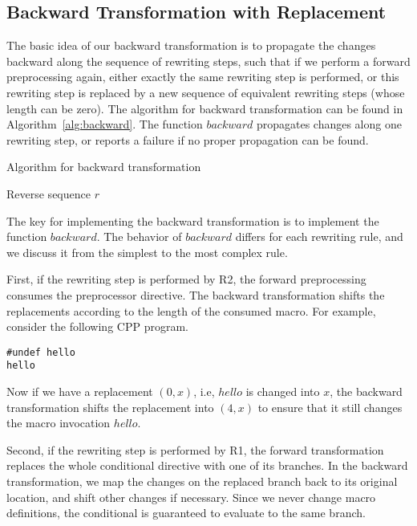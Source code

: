 

\subsection{Backward Transformation with Replacement}\label{sec:backward}
The basic idea of our backward transformation is to propagate the
changes backward along the sequence of rewriting steps, such that
if we perform a forward preprocessing again, either exactly the same
rewriting step is performed, or this rewriting step is replaced by a
new sequence of equivalent rewriting steps (whose length can 
be zero). The algorithm for backward
transformation can be found in Algorithm~\ref{alg:backward}. The
function $backward$ propagates changes along one rewriting step,
or reports a failure if no proper propagation can be found.

\begin{algorithm}
  \newcommand\mycommfont[1]{\rmfamily{#1}}
  \caption{Algorithm for backward transformation \label{alg:backward}}
  Reverse sequence $r$\;
  \;
\end{algorithm}

The key for implementing the backward transformation is to implement the
function $backward$. The behavior of $backward$ differs for each
rewriting rule, and we discuss it from the simplest to
the most complex rule.

First, if the rewriting step is performed by R2, the forward
preprocessing consumes the preprocessor directive. The backward
transformation shifts the replacements according to the length of the
consumed macro. For example, consider the following CPP program.
\begin{lstlisting}
#undef hello
hello
\end{lstlisting}
Now if we have a replacement $(0, x)$, i.e, $hello$ is changed into
$x$, the backward transformation shifts the replacement into $(4, x)$ to ensure
that it still changes the macro invocation $hello$.

Second, if the rewriting step is performed by R1, the forward
transformation replaces the whole conditional directive with one of its branches. In the
backward transformation, we map the changes on the replaced branch
back to its original location, and shift other changes if necessary.
Since we never change macro definitions, the conditional is guaranteed to 
evaluate to the same branch.

